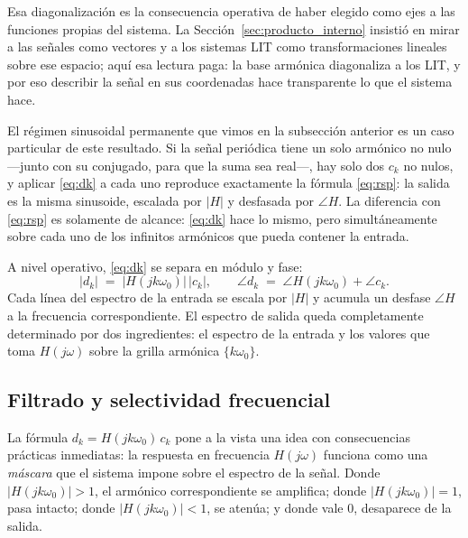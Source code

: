\documentclass[class=book, crop=false]{standalone}
\begin{document}
Esa diagonalización es la consecuencia operativa de haber elegido como ejes a las funciones propias del sistema. La Sección~\ref{sec:producto_interno} insistió en mirar a las señales como vectores y a los sistemas LIT como transformaciones lineales sobre ese espacio; aquí esa lectura paga: la base armónica diagonaliza a los LIT, y por eso describir la señal en sus coordenadas hace transparente lo que el sistema hace.

El régimen sinusoidal permanente que vimos en la subsección anterior es un caso particular de este resultado. Si la señal periódica tiene un solo armónico no nulo ---junto con su conjugado, para que la suma sea real---, hay solo dos $c_k$ no nulos, y aplicar \eqref{eq:dk} a cada uno reproduce exactamente la fórmula \eqref{eq:rsp}: la salida es la misma sinusoide, escalada por $|H|$ y desfasada por $\angle H$. La diferencia con \eqref{eq:rsp} es solamente de alcance: \eqref{eq:dk} hace lo mismo, pero simultáneamente sobre cada uno de los infinitos armónicos que pueda contener la entrada.

A nivel operativo, \eqref{eq:dk} se separa en módulo y fase:
\begin{equation*}
    |d_k| \;=\; |H(jk\omega_0)|\,|c_k|,
    \qquad
    \angle d_k \;=\; \angle H(jk\omega_0) + \angle c_k.
\end{equation*}
Cada línea del espectro de la entrada se escala por $|H|$ y acumula un desfase $\angle H$ a la frecuencia correspondiente. El espectro de salida queda completamente determinado por dos ingredientes: el espectro de la entrada y los valores que toma $H(j\omega)$ sobre la grilla armónica $\{k\omega_0\}$.

\subsection{Filtrado y selectividad frecuencial}
\label{subsec:filtrado}

La fórmula $d_k = H(jk\omega_0)\,c_k$ pone a la vista una idea con consecuencias prácticas inmediatas: la respuesta en frecuencia $H(j\omega)$ funciona como una \emph{máscara} que el sistema impone sobre el espectro de la señal. Donde $|H(jk\omega_0)| > 1$, el armónico correspondiente se amplifica; donde $|H(jk\omega_0)| = 1$, pasa intacto; donde $|H(jk\omega_0)| < 1$, se atenúa; y donde vale $0$, desaparece de la salida.
\end{document}
